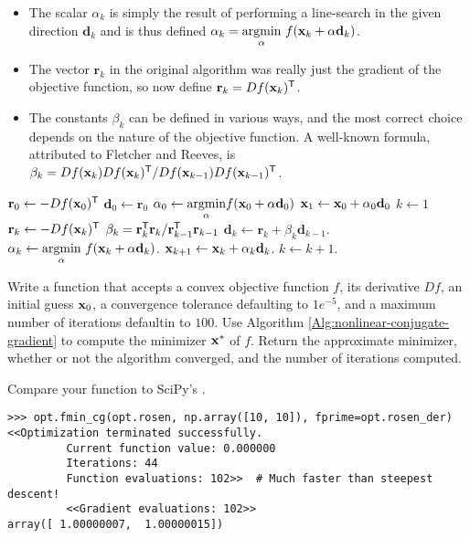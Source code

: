 \begin{itemize}
\item The scalar $\alpha_k$ is simply the result of performing a line-search in the given direction $\mathbf{d}_k$ and is thus defined $\alpha_k = \underset{\alpha}{\text{argmin}}\ f(\mathbf{x}_k + \alpha \mathbf{d}_k)$.
\item The vector $\mathbf{r}_k$ in the original algorithm was really just the gradient of the objective function, so now define $\mathbf{r}_k = Df(\mathbf{x}_k)^{\mathsf T}$.
\item The constants $\beta_k$ can be defined in various ways, and the most correct choice depends on the nature of the objective function.
A well-known formula, attributed to Fletcher and Reeves, is $\beta_{k} = Df(\mathbf{x}_k)Df(\mathbf{x}_{k})^{\mathsf T} / Df(\mathbf{x}_{k-1}) Df(\mathbf{x}_{k-1})^{\mathsf T}$.
\end{itemize}
%

\begin{algorithm}[H]
\begin{algorithmic}[1]
    \State $\mathbf{r}_0 \gets -Df(\mathbf{x}_0)^{\mathsf T}$
    \State $\mathbf{d}_0 \gets \mathbf{r}_0$
    \State $\alpha_0 \gets \underset{\alpha}{\text{argmin}} f(\mathbf{x}_0 + \alpha\mathbf{d}_0)$
    \State $\mathbf{x}_{1} \gets \mathbf{x}_0 + \alpha_0 \mathbf{d}_0$
    \State $k \gets 1$
        \State $\mathbf{r}_{k} \gets -Df(\mathbf{x}_k)^{\mathsf T}$
        \State $\beta_{k} = \mathbf{r}_{k}^{\mathsf T} \mathbf{r}_k / \mathbf{r}_{k-1}^{\mathsf T} \mathbf{r}_{k-1}$
        \State $\mathbf{d}_{k} \gets \mathbf{r}_{k} + \beta_{k}\mathbf{d}_{k-1}$.
        \State $\alpha_k \gets \underset{\alpha}{\text{argmin}}\ f(\mathbf{x}_k + \alpha\mathbf{d}_k)$.
        \State $\mathbf{x}_{k+1} \gets \mathbf{x}_k + \alpha_k\mathbf{d}_k$.
        \State $k \gets k+1$.
    \EndWhile
\EndProcedure
\end{algorithmic}
\caption{}
\label{Alg:nonlinear-conjugate-gradient}
\end{algorithm}

\begin{problem}
Write a function that accepts a convex objective function $f$, its derivative $Df$, an initial guess $\mathbf{x}_0$, a convergence tolerance defaulting to $1e^{-5}$, and a maximum number of iterations defaultin to $100$.
Use Algorithm \ref{Alg:nonlinear-conjugate-gradient} to compute the minimizer $\mathbf{x}^*$ of $f$.
Return the approximate minimizer, whether or not the algorithm converged, and the number of iterations computed.

Compare your function to SciPy's .
\begin{lstlisting}
>>> opt.fmin_cg(opt.rosen, np.array([10, 10]), fprime=opt.rosen_der)
<<Optimization terminated successfully.
         Current function value: 0.000000
         Iterations: 44
         Function evaluations: 102>>  # Much faster than steepest descent!
         <<Gradient evaluations: 102>>
array([ 1.00000007,  1.00000015])
\end{lstlisting}
\label{prob:gradientdescent-nonlinear-cg}
\end{problem}

